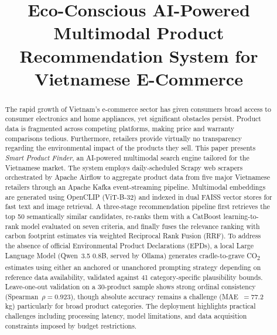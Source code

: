 \documentclass[conference]{IEEEtran}
\begin{document}
\title{Eco-Conscious AI-Powered Multimodal Product Recommendation System for Vietnamese E-Commerce}

\author{
}

\maketitle

\begin{abstract}
The rapid growth of Vietnam's e-commerce sector has given consumers broad access to consumer electronics and home appliances, yet significant obstacles persist. Product data is fragmented across competing platforms, making price and warranty comparisons tedious. Furthermore, retailers provide virtually no transparency regarding the environmental impact of the products they sell. This paper presents \textit{Smart Product Finder}, an AI-powered multimodal search engine tailored for the Vietnamese market. The system employs daily-scheduled Scrapy web scrapers orchestrated by Apache Airflow to aggregate product data from five major Vietnamese retailers through an Apache Kafka event-streaming pipeline. Multimodal embeddings are generated using OpenCLIP (ViT-B-32) and indexed in dual FAISS vector stores for fast text and image retrieval. A three-stage recommendation pipeline first retrieves the top 50 semantically similar candidates, re-ranks them with a CatBoost learning-to-rank model evaluated on seven criteria, and finally fuses the relevance ranking with carbon footprint estimates via weighted Reciprocal Rank Fusion (RRF). To address the absence of official Environmental Product Declarations (EPDs), a local Large Language Model (Qwen~3.5 0.8B, served by Ollama) generates cradle-to-grave CO\textsubscript{2} estimates using either an anchored or unanchored prompting strategy depending on reference data availability, validated against 41 category-specific plausibility bounds. Leave-one-out validation on a 30-product sample shows strong ordinal consistency (Spearman~$\rho = 0.923$), though absolute accuracy remains a challenge (MAE~$= 77.2$\,kg) particularly for broad product categories. The deployment highlights practical challenges including processing latency, model limitations, and data acquisition constraints imposed by budget restrictions.
\end{abstract}
\end{document}

